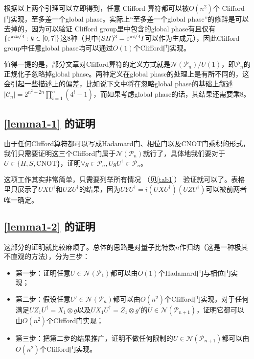 \documentclass[8pt]{article}
\begin{document}
根据以上两个引理可以立即得到，任意 Clifford 算符都可以被$O(n^2)$个 Clifford 门实现，至多差一个global phase。实际上“至多差一个global phase”的修辞是可以去掉的，因为可以验证 Clifford group里中包含的global phase有且仅有$\{\text e^{\pi i k/ 4}: k \in [0, 7]\}$这$8$种（其中$(SH)^3 = \text e^{\pi i / 4}I$可以作为生成元），因此Clifford group中任意global phase均可以通过$O(1)$个Clifford门实现。

值得一提的是，部分文章\cite{paper2}对Clifford算符的定义方式就是$\mathcal N(\mathcal P_n) / U(1)$，即$\mathcal P_n$的正规化子忽略掉global phase。两种定义在global phase的处理上是有所不同的，这会引起一些描述上的偏差，比如说下文中将在忽略global phase的基础上叙述$|\mathcal C_n| = 2^{n^2 + 2n}\prod_{i=1}^{n}(4^i-1)$，而如果考虑global phase的话，其结果还需要乘$8$。

\subsection{\cref{lemma1-1} 的证明}

由于任何Clifford算符都可以写成Hadamard门、相位门以及CNOT门乘积的形式，我们只需要证明这三个Clifford门属于$\mathcal N(\mathcal P_n)$就行了，具体地我们要对于$U \in \{H, S, \text{CNOT}\}$，证明$\forall g \in \mathcal P_n, UgU^{\dagger} \in \mathcal P_n$。

这项工作其实非常简单，只需要列举所有情况 （见\cref{tab1}） 验证就可以了。表格里只展示了$UXU^{\dagger}$和$UZU^{\dagger}$的结果，因为$UYU^{\dagger} = i(UXU^{\dagger})(UZU^{\dagger})$可以被前两者唯一确定。


\subsection{\cref{lemma1-2} 的证明}

这部分的证明就比较麻烦了。总体的思路是对量子比特数$n$作归纳（这是一种极其不直观的方法），分为三步：

\begin{itemize}
	\item 第一步：证明任意$U \in \mathcal N(\mathcal P_1)$都可以由$O(1)$个Hadamard门与相位门实现；
	\item 第二步：假设任意$U' \in \mathcal N(\mathcal P_n)$都可以由$O(n^2)$个Clifford门实现，对于任何满足$UZ_1U^{\dagger} = X_1 \otimes g$以及$UX_1U^{\dagger} = Z_1 \otimes g'$的$U \in \mathcal N(\mathcal P_{n+1})$，证明它都可以由$O(n^2)$个Clifford门实现；
	\item 第三步：把第二步的结果推广，证明不做任何限制的$U \in \mathcal N(\mathcal P_{n+1})$都可以由$O(n^2)$个Clifford门实现。
\end{itemize}
\end{document}
